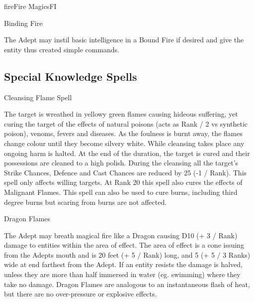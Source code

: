 \begin{college}[2.0]{fire}{Fire Magics}{FI}
\begin{ritual}[Q-1]{Binding Fire}
\begin{effects}
The Adept may instil basic intelligence in a Bound Fire if desired and
give the entity thus created simple commands.
\end{effects}
\end{ritual}

\subsection{Special Knowledge Spells}

\begin{spell}[S-1]{Cleansing Flame Spell}
\begin{effects}
The target is wreathed in yellowy green flames causing hideous
suffering, yet curing the target of the effects of natural poisons
(acts as Rank / 2 vs synthetic poison), venoms, fevers and diseases. As
the foulness is burnt away, the flames change colour until they become
silvery white. While cleansing takes place any ongoing harm is
halted. At the end of the duration, the target is cured and their
possessions are cleaned to a high polish. During the cleansing all the
target's Strike Chances, Defence and Cast Chances are reduced by 25
(-1 / Rank). This spell only affects willing targets. At Rank 20 this
spell also cures the effects of Malignant Flames. This spell can also
be used to cure burns, including third degree burns but scaring from
burns are not affected.
\end{effects}
\end{spell}

\begin{spell}[S-2]{Dragon Flames}
\begin{effects}
The Adept may breath magical fire like a Dragon causing D10 (+ 3 /
Rank) damage to entities within the area of effect. The area of effect
is a cone issuing from the Adepts mouth and is 20 feet (+ 5 / Rank)
long, and 5 (+ 5 / 3 Ranks) wide at end farthest from the Adept. If an
entity resists the damage is halved, unless they are more than half
immersed in water (eg. swimming) where they take no damage. Dragon
Flames are analogous to an instantaneous flash of heat, but there are
no over-pressure or explosive effects.
\end{effects}
\end{spell}


\end{college}
